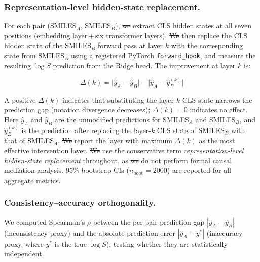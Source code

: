 \documentclass[twoside,twocolumn,9pt]{article}
\makeatletter
\newcommand{\logS}{\ensuremath{\log S}}
\providecommand{\DIFaddtex}[1]{{\protect\color{blue}\uwave{#1}}} %
\providecommand{\DIFdeltex}[1]{{\protect\color{red}\sout{#1}}} %
\providecommand{\DIFaddbegin}{} %
\providecommand{\DIFaddend}{} %
\providecommand{\DIFdelbegin}{} %
\providecommand{\DIFdelend}{} %
\providecommand{\DIFadd}[1]{\texorpdfstring{\DIFaddtex{#1}}{#1}} %
\providecommand{\DIFdel}[1]{\texorpdfstring{\DIFdeltex{#1}}{}} %
\providecommand{\DIFscaledelfig}{0.5}
\newlength{\DIFdelgraphicswidth} %
\newlength{\DIFdelgraphicsheight} %
\providecommand{\DIFaddincludegraphics}[2][]{{\color{blue}\fbox{\DIFOincludegraphics[#1]{#2}}}} %
\providecommand{\DIFdelincludegraphics}[2][]{%
\sbox{\DIFdelgraphicsbox}{\DIFOincludegraphics[#1]{#2}}%
\settoboxwidth{\DIFdelgraphicswidth}{\DIFdelgraphicsbox} %
\settoboxtotalheight{\DIFdelgraphicsheight}{\DIFdelgraphicsbox} %
\scalebox{\DIFscaledelfig}{%
\parbox[b]{\DIFdelgraphicswidth}{\usebox{\DIFdelgraphicsbox}\\[-\baselineskip] \rule{\DIFdelgraphicswidth}{0em}}\llap{\resizebox{\DIFdelgraphicswidth}{\DIFdelgraphicsheight}{%
\setlength{\unitlength}{\DIFdelgraphicswidth}%
\begin{picture}(1,1)%
\thicklines\linethickness{2pt} %
{\color[rgb]{1,0,0}\put(0,0){\framebox(1,1){}}}%
{\color[rgb]{1,0,0}\put(0,0){\line( 1,1){1}}}%
{\color[rgb]{1,0,0}\put(0,1){\line(1,-1){1}}}%
\end{picture}%
}\hspace*{3pt}}} %
} %
\DeclareRobustCommand{\DIFaddbegin}{\DIFOaddbegin \let\includegraphics\DIFaddincludegraphics} %
\DeclareRobustCommand{\DIFaddend}{\DIFOaddend \let\includegraphics\DIFOincludegraphics} %
\DeclareRobustCommand{\DIFdelbegin}{\DIFOdelbegin \let\includegraphics\DIFdelincludegraphics} %
\DeclareRobustCommand{\DIFdelend}{\DIFOaddend \let\includegraphics\DIFOincludegraphics} %
\let\sout@orig\sout %
\renewcommand{\sout}[1]{\ifmmode\text{\sout@orig{\ensuremath{#1}}}\else\sout@orig{#1}\fi} %
\makeatother
\begin{document}
\subsubsection{Representation-level hidden-state replacement.~~} For each pair (SMILES$_A$, SMILES$_B$), \DIFdelbegin \DIFdel{we }\DIFdelend \DIFaddbegin \DIFadd{I }\DIFaddend extract CLS hidden states at all seven positions (embedding layer\,$+$\,six transformer layers). \DIFdelbegin \DIFdel{We }\DIFdelend \DIFaddbegin \DIFadd{I }\DIFaddend then replace the CLS hidden state of the SMILES$_B$ forward pass at layer $k$ with the corresponding state from SMILES$_A$ using a registered PyTorch \texttt{forward\_hook}, and measure the resulting $\logS$ prediction from the Ridge head. The improvement at layer $k$ is:

\begin{equation}
  \Delta(k) = \bigl|\hat{y}_A - \hat{y}_B\bigr| - \bigl|\hat{y}_A - \hat{y}_{B}^{(k)}\bigr|
  \label{eq:improvement}
\end{equation}

A positive $\Delta(k)$ indicates that substituting the layer-$k$ CLS state narrows the prediction gap (notation divergence decreases); $\Delta(k)=0$ indicates no effect. Here $\hat{y}_A$ and $\hat{y}_B$ are the unmodified predictions for SMILES$_A$ and SMILES$_B$, and $\hat{y}_{B}^{(k)}$ is the prediction after replacing the layer-$k$ CLS state of SMILES$_B$ with that of SMILES$_A$. \DIFdelbegin \DIFdel{We }\DIFdelend \DIFaddbegin \DIFadd{I }\DIFaddend report the layer with maximum $\Delta(k)$ as the most effective intervention layer. \DIFdelbegin \DIFdel{We }\DIFdelend \DIFaddbegin \DIFadd{I }\DIFaddend use the conservative term \textit{representation-level hidden-state replacement} throughout, as \DIFdelbegin \DIFdel{we }\DIFdelend \DIFaddbegin \DIFadd{I }\DIFaddend do not perform formal causal mediation analysis. 95\% bootstrap CIs ($n_\text{boot}=2000$) are reported for all aggregate metrics.

\subsubsection{Consistency--accuracy orthogonality.~~} \DIFdelbegin \DIFdel{We }\DIFdelend \DIFaddbegin \DIFadd{I }\DIFaddend computed Spearman's $\rho$ between the per-pair prediction gap $|\hat{y}_A - \hat{y}_B|$ (inconsistency proxy) and the absolute prediction error $|\hat{y}_A - y^\ast|$ (inaccuracy proxy, where $y^\ast$ is the true $\logS$), testing whether they are statistically independent.
\end{document}
